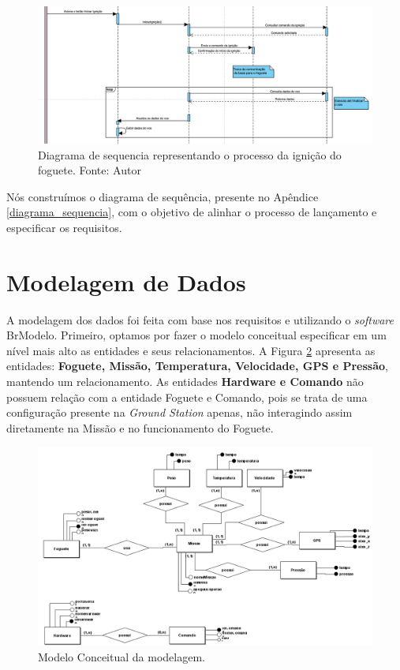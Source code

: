 \begin{figure}[htb]
    \centering
    \includegraphics[width=1\textwidth, angle=0]{figuras/diagrama_sequencia_ignicao.png}
    \caption{Diagrama de sequencia representando o processo da ignição do foguete. Fonte: Autor}
    \label{fig:Diagrama_sequencia_missao_1}
\end{figure}

\par Nós construímos o diagrama de sequência, presente no Apêndice \ref{diagrama_sequencia}, com o objetivo de alinhar o processo de lançamento e especificar os requisitos.

\section{Modelagem de Dados}

\par A modelagem dos dados foi feita com base nos requisitos e utilizando o \textit{software} BrModelo. Primeiro, optamos por fazer o modelo conceitual especificar em um nível mais alto as entidades e seus relacionamentos. A Figura \ref{fig:conceitual} apresenta as entidades: \textbf{Foguete, Missão, Temperatura, Velocidade, GPS e Pressão}, mantendo um relacionamento. As entidades \textbf{Hardware e Comando} não possuem relação com a entidade Foguete e Comando, pois se trata de uma configuração presente na \textit{Ground Station} apenas, não interagindo assim diretamente na Missão e no funcionamento do Foguete.

\begin{figure}[h!]
	\centering
		\includegraphics[keepaspectratio=true,scale=0.4]{figuras/conceitual_ground_station.png}
	\caption{Modelo Conceitual da modelagem.}
	\label{fig:conceitual}
\end{figure}


